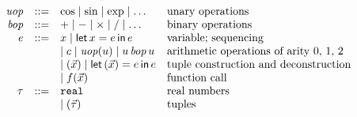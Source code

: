 \[\begin{array}{rcll}
\mathit{uop} & ::= &
  \cos \mid \sin \mid \exp \mid \ldots
  & \text{unary operations}
\\
\mathit{bop} & ::= &
  \mathord{+} \mid \mathord{-} \mid \mathord{\times} \mid \mathord{/} \mid \ldots
  & \text{binary operations}
\\
e & ::= &
  x
\mid
  \mathsf{let}\,x=e\,\mathsf{in}\,e
  & \text{variable; sequencing}
\\&&
\mid
  c
\mid
  \mathit{uop}(u)
\mid
  u\mathop{\mathit{bop}}u
  & \text{arithmetic operations of arity 0, 1, 2}
\\&&
\mid
  (\vec{x})
\mid
  \mathsf{let}\,(\vec{x})=e\,\mathsf{in}\,e
  & \text{tuple construction and deconstruction}
\\&&
\mid
  f(\vec{x})
  & \text{function call}
\\
\tau & ::= &
  \text{\texttt{real}}
  & \text{real numbers}
  \\&&
\mid
  (\vec\tau)
  & \text{tuples}
\\
\end{array}\]
